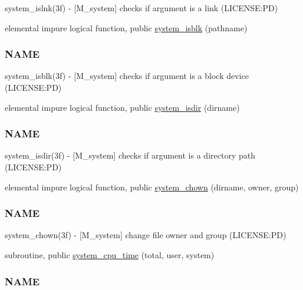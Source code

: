 \begin{DoxyCompactItemize}
\begin{DoxyCompactList}
system\+\_\+islnk(3f) -\/ \mbox{[}M\+\_\+system\mbox{]} checks if argument is a link (L\+I\+C\+E\+N\+SE\+:PD) \end{DoxyCompactList}\item 
elemental impure logical function, public \mbox{\hyperlink{namespacem__system_a1294b8d8b4910261c0a0991bf668ab67}{system\+\_\+isblk}} (pathname)
\begin{DoxyCompactList}\small\item\em \subsubsection*{N\+A\+ME}

system\+\_\+isblk(3f) -\/ \mbox{[}M\+\_\+system\mbox{]} checks if argument is a block device (L\+I\+C\+E\+N\+SE\+:PD) \end{DoxyCompactList}\item 
elemental impure logical function, public \mbox{\hyperlink{namespacem__system_a7946ea976f399baff21caebcbe931f6d}{system\+\_\+isdir}} (dirname)
\begin{DoxyCompactList}\small\item\em \subsubsection*{N\+A\+ME}

system\+\_\+isdir(3f) -\/ \mbox{[}M\+\_\+system\mbox{]} checks if argument is a directory path (L\+I\+C\+E\+N\+SE\+:PD) \end{DoxyCompactList}\item 
elemental impure logical function, public \mbox{\hyperlink{namespacem__system_ab89e4d2fb219225c374570d4f9d58e9b}{system\+\_\+chown}} (dirname, owner, group)
\begin{DoxyCompactList}\small\item\em \subsubsection*{N\+A\+ME}

system\+\_\+chown(3f) -\/ \mbox{[}M\+\_\+system\mbox{]} change file owner and group (L\+I\+C\+E\+N\+SE\+:PD) \end{DoxyCompactList}\item 
subroutine, public \mbox{\hyperlink{namespacem__system_a257d2b8987db850bc686507f19ccbe4a}{system\+\_\+cpu\+\_\+time}} (total, user, system)
\begin{DoxyCompactList}\small\item\em \subsubsection*{N\+A\+ME}


\end{DoxyCompactList}
\end{DoxyCompactItemize}
